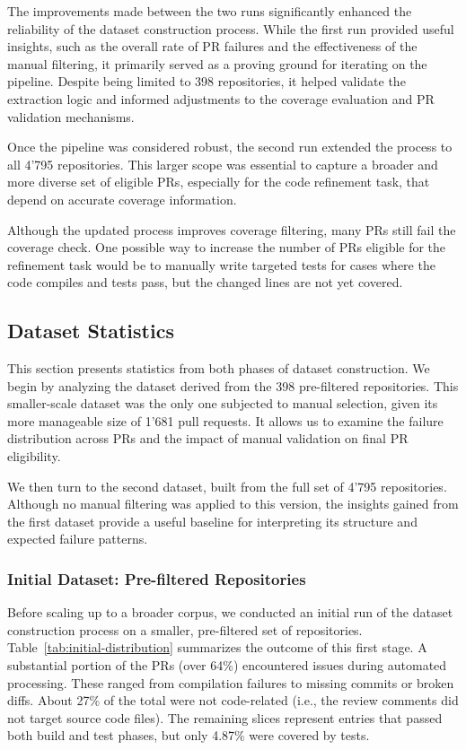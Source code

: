 The improvements made between the two runs significantly enhanced the reliability of the dataset
construction process. While the first run provided useful insights, such as the overall rate of PR
failures and the effectiveness of the manual filtering, it primarily served as a proving ground for
iterating on the pipeline. Despite being limited to 398 repositories, it helped validate the
extraction logic and informed adjustments to the coverage evaluation and PR validation mechanisms.

Once the pipeline was considered robust, the second run extended the process to all 4'795
repositories. This larger scope was essential to capture a broader and more diverse set of eligible
PRs, especially for the code refinement task, that depend on accurate coverage information.

Although the updated process improves coverage filtering, many PRs still fail the coverage check.
One possible way to increase the number of PRs eligible for the refinement task would be to manually
write targeted tests for cases where the code compiles and tests pass, but the changed lines are not
yet covered.

\subsection{Dataset Statistics}

This section presents statistics from both phases of dataset construction. We begin by analyzing the
dataset derived from the 398 pre-filtered repositories. This smaller-scale dataset was the only one
subjected to manual selection, given its more manageable size of 1'681 pull requests. It allows us
to examine the failure distribution across PRs and the impact of manual validation on final PR
eligibility.

We then turn to the second dataset, built from the full set of 4'795 repositories. Although no
manual filtering was applied to this version, the insights gained from the first dataset provide a
useful baseline for interpreting its structure and expected failure patterns.

\subsubsection{Initial Dataset: Pre-filtered Repositories}
\label{sec:stat-small}

Before scaling up to a broader corpus, we conducted an initial run of the dataset construction
process on a smaller, pre-filtered set of repositories. Table~\ref{tab:initial-distribution}
summarizes the outcome of this first stage. A substantial portion of the PRs (over 64\%) encountered
issues during automated processing. These ranged from compilation failures to missing commits or
broken diffs. About 27\% of the total were not code-related (i.e., the review comments did not
target source code files). The remaining slices represent entries that passed both build and test
phases, but only 4.87\% were covered by tests.

